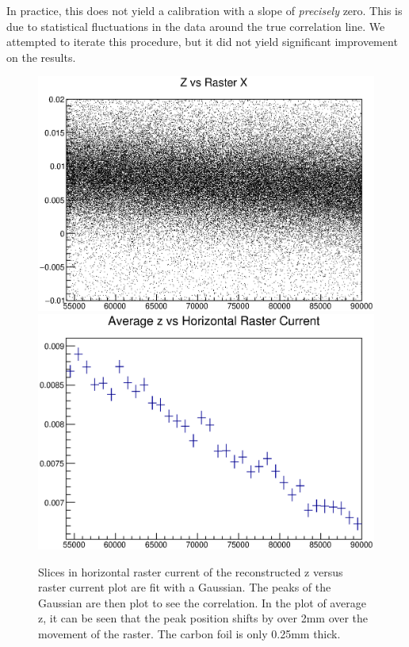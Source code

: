 In practice, this does not yield a calibration with a slope of \textit{precisely} zero. This is due to statistical fluctuations in the data around the true correlation line. We attempted to iterate this procedure, but it did not yield significant improvement on the results.

\begin{figure}
	\includegraphics[width=\textwidth]{./chap3-analysis/fig/old1_zvx.eps}
	\includegraphics[width=\textwidth]{./chap3-analysis/fig/old1_avgz_nofit.eps}
	\caption{Slices in horizontal raster current of the reconstructed z versus raster current plot are fit with a Gaussian. The peaks of the Gaussian are then plot to see the correlation. In the plot of average z, it can be seen that the peak position shifts by over 2mm over the movement of the raster. The carbon foil is only 0.25mm thick.}
\end{figure}

